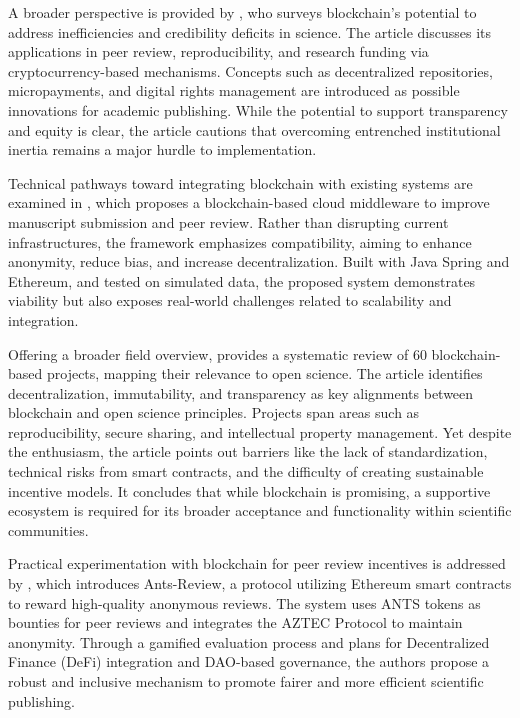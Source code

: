 \documentclass{article}
\begin{document}
A broader perspective is provided by \cite{van_rossum_blockchain_2018}, who surveys blockchain’s potential to address inefficiencies and credibility deficits in science. The article discusses its applications in peer review, reproducibility, and research funding via cryptocurrency-based mechanisms. Concepts such as decentralized repositories, micropayments, and digital rights management are introduced as possible innovations for academic publishing. While the potential to support transparency and equity is clear, the article cautions that overcoming entrenched institutional inertia remains a major hurdle to implementation.

Technical pathways toward integrating blockchain with existing systems are examined in \cite{gazis_blockchain_2022}, which proposes a blockchain-based cloud middleware to improve manuscript submission and peer review. Rather than disrupting current infrastructures, the framework emphasizes compatibility, aiming to enhance anonymity, reduce bias, and increase decentralization. Built with Java Spring and Ethereum, and tested on simulated data, the proposed system demonstrates viability but also exposes real-world challenges related to scalability and integration.

Offering a broader field overview, \cite{leible_review_2019} provides a systematic review of 60 blockchain-based projects, mapping their relevance to open science. The article identifies decentralization, immutability, and transparency as key alignments between blockchain and open science principles. Projects span areas such as reproducibility, secure sharing, and intellectual property management. Yet despite the enthusiasm, the article points out barriers like the lack of standardization, technical risks from smart contracts, and the difficulty of creating sustainable incentive models. It concludes that while blockchain is promising, a supportive ecosystem is required for its broader acceptance and functionality within scientific communities.

Practical experimentation with blockchain for peer review incentives is addressed by \cite{trovo_ants-review_2021}, which introduces Ants-Review, a protocol utilizing Ethereum smart contracts to reward high-quality anonymous reviews. The system uses ANTS tokens as bounties for peer reviews and integrates the AZTEC Protocol to maintain anonymity. Through a gamified evaluation process and plans for Decentralized Finance (DeFi) integration and DAO-based governance, the authors propose a robust and inclusive mechanism to promote fairer and more efficient scientific publishing.
\end{document}
